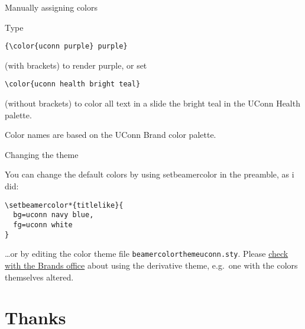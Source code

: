 \documentclass{beamer}
\begin{document}
\begin{frame}[fragile]{Manually assigning colors}

Type
\begin{verbatim}
{\color{uconn purple} purple}
\end{verbatim}
(with brackets) to render {\color{uconn purple} purple}, or set
\begin{verbatim}
\color{uconn health bright teal}
\end{verbatim}
\color{uconn health bright teal}
(without brackets) to color all text in a slide the bright teal in the UConn Health palette.

\color{black}\vfill
Color names are based on the UConn Brand color palette.

\center\href{http://brand.uconn.edu/standards/color-palette/}{}

\end{frame}


\begin{frame}[fragile]{Changing the theme}

You can change the default colors by using setbeamercolor in the preamble, as i did:
\begin{verbatim}
\setbeamercolor*{titlelike}{
  bg=uconn navy blue,
  fg=uconn white
}
\end{verbatim}
\ldots or by editing the color theme file {\tt beamercolorthemeuconn.sty}.
Please \hyperlink{mailto:brand@uconn.edu}{check with the Brands office} about using the derivative theme, e.g.\ one with the colors themselves altered.

\end{frame}


\section{Thanks}
\end{document}
